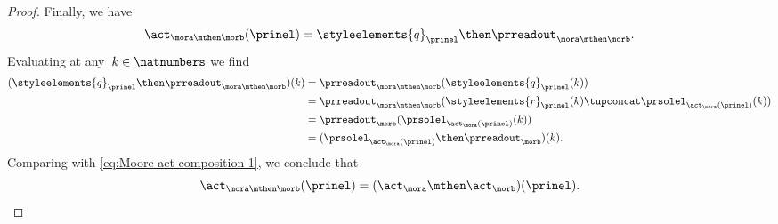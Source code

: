 \begin{proof}
    Finally, we have
    \begin{equation*}
        \act_{\mora \mthen \morb}(\prinel) = \styleelements{q}_\prinel \then \prreadout_{\mora \mthen \morb}.
    \end{equation*}
    Evaluating at any~$k \in \natnumbers$ we find
    \begin{align*}
        (\styleelements{q}_\prinel \then \prreadout_{\mora \mthen \morb})(k) & = \prreadout_{\mora \mthen \morb}(\styleelements{q}_\prinel(k)) \\
                                                                             & = \prreadout_{\mora \mthen \morb}(\styleelements{r}_\prinel(k) \tupconcat \prsolel_{\act_\mora(\prinel)}(k)) \\
                                                                             & = \prreadout_{\morb}(\prsolel_{\act_\mora(\prinel)}(k)) \\
                                                                             & = (\prsolel_{\act_\mora(\prinel)} \then \prreadout_{\morb})(k).
    \end{align*}
    Comparing with \cref{eq:Moore-act-composition-1}, we conclude that
    \begin{equation*}
        \act_{\mora \mthen \morb}(\prinel) = (\act_\mora \mthen \act_\morb)(\prinel).
    \end{equation*}
\end{proof}


